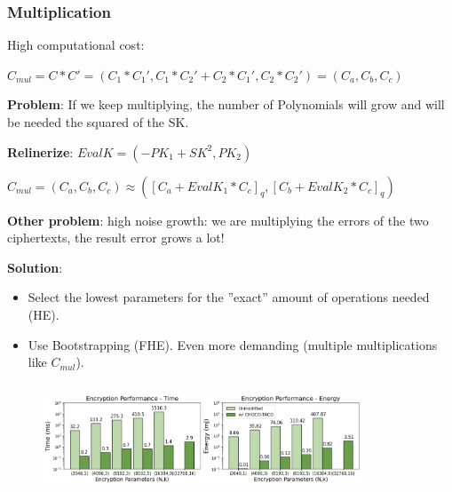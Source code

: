 \documentclass[10pt,handout]{beamer}
\begin{document}
\begin{frame}[noframenumbering]

    \frametitle{Multiplication}

    High computational cost:
    \vspace{-0.15cm}

    $C_{mul} = C*C' = (C_1*C_1',C_1*C_2'+C_2*C_1', C_2*C_2') = (C_a,C_b,C_c)$
    \vspace{-0.15cm}

    \textbf{Problem}: If we keep multiplying, the number of Polynomials will grow and will be needed
    the squared of the SK.

    \textbf{Relinerize}:
    $EvalK = (-PK_1+SK^2, PK_2)$

    $C_{mul} = (C_a, C_b, C_c)\approx ([C_a+EvalK_1*C_c]_q, [C_b+EvalK_2*C_c]_q)$

    \textbf{Other problem}: high noise growth: we are multiplying the errors of the two ciphertexts, the result error
    grows a lot!
    \vspace{-0.1cm}

    \textbf{Solution}: \vspace{-0.3cm}
    \begin{itemize} \vspace{-0.2cm}
        \item Select the lowest parameters for the ''exact'' amount  of operations needed (HE). \vspace{-0.2cm}
            \vspace{-0.25cm}
        \item Use Bootstrapping  (FHE). Even more demanding (multiple multiplications like $C_{mul}$).
    \end{itemize}
\end{frame}

\begin{frame}[noframenumbering]
\frametitle{}
\begin{figure}
    \includegraphics[width=0.85\textwidth]{SW_comp.png}
\end{figure}

\end{frame}
\end{document}
